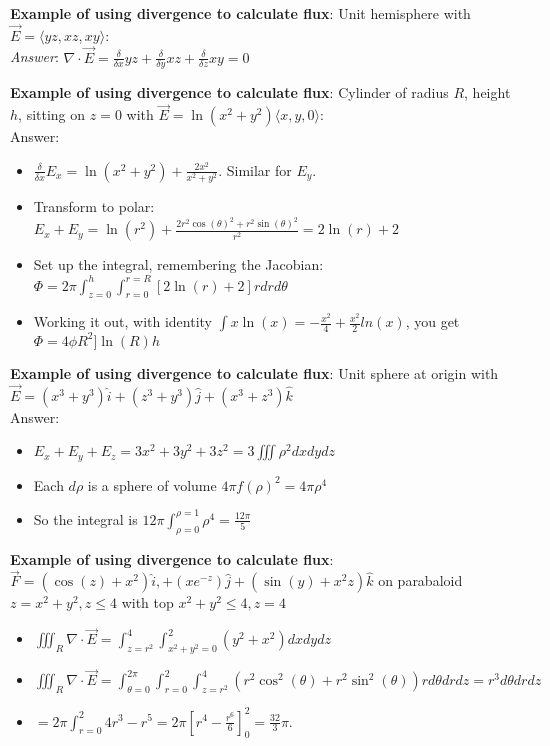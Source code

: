 \documentclass[11pt, oneside]{article}   	%
\begin{document}
\textbf{Example of using divergence to calculate flux}: Unit hemisphere with $\vec{E} = \langle yz, xz, xy \rangle$:
\\
\emph{Answer}: $\nabla \cdot \vec{E} = \frac{\delta}{\delta x} yz +  \frac{\delta}{\delta y} xz +  \frac{\delta}{\delta z} xy  = 0$

\textbf{Example of using divergence to calculate flux}: Cylinder of radius $R$, height $h$, sitting on $z = 0$ with $\vec{E} = \ln(x^2 + y^2) \langle x, y, 0 \rangle$:
\\
Answer:
\begin{itemize}
\item $\frac{\delta}{\delta x} E_x =  \ln(x^2 + y^2) + \frac{2x^2}{x^2 + y^2}$.  Similar for $E_y$.
\item Transform to polar: $E_x + E_y = \ln(r^2) + \frac{2 r^2 \cos(\theta)^2 + r^2 \sin(\theta)^2}{r^2} = 2\ln(r) + 2$
\item Set up the integral, remembering the Jacobian: $\Phi = 2 \pi \int_{z = 0}^h \int_{r = 0}^{r=R} [ 2\ln(r) + 2 ] r dr d\theta$
\item Working it out, with identity $\int x \ln(x) = -\frac{x^2}{4} + \frac{x^2}{2}ln(x)$, you get $\Phi = 4 \phi R^2 ]\ln(R) h$
\end{itemize}

\textbf{Example of using divergence to calculate flux}: Unit sphere at origin with $\vec{E} = (x^3 + y^3)\hat{i} +  (z^3 + y^3)\hat{j} +  (x^3 + z^3)\hat{k}$ 
\\
Answer:
\begin{itemize}
\item $ E_x + E_y + E_z =  3x^2 + 3y^2 + 3z^2  = 3 \iiint \rho^2 dx dy dz$
\item Each $d \rho$ is a sphere of volume $4 \pi f(\rho)^2 = 4 \pi \rho^4$
\item So the integral is $12 \pi \int_{\rho = 0}^{\rho = 1} \rho^4 = \frac{12\pi}{5}$ 
\end{itemize}


\textbf{Example of using divergence to calculate flux}: $\vec{F} =  (\cos(z)+x^2)\hat{i}, + (xe^{-z})\hat{j} + (\sin(y) +x^2z)\hat{k}$  on parabaloid $z = x^2+y^2, z \leq 4$ with top $x^2+y^2 \leq 4, z=4$
\begin{itemize}
\item $\iiint_R \nabla \cdot \vec{E} = \int_{z = r^2}^4 \int_{x^2 + y^2 = 0}^2 (y^2 + x^2) dx dy dz$
\item $\iiint_R \nabla \cdot \vec{E} = \int_{\theta = 0}^{2 \pi} \int_{r=0}^2 \int_{z=r^2}^4 (r^2\cos^2(\theta) + r^2\sin^2(\theta)) r d\theta dr dz = r^3 d\theta dr dz$
\item $= 2 \pi  \int_{r=0}^2 4r^3 - r^5 = 2\pi[r^4 - \frac{r^6}{6} ]_0^2 = \frac{32}{3}\pi$.
\end{itemize}
\end{document}
